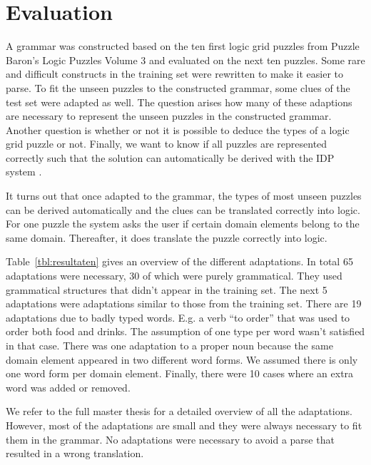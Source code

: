 \section{Evaluation}
A grammar was constructed based on the ten first logic grid puzzles from Puzzle Baron's Logic Puzzles Volume 3 \cite{logigrammen} and evaluated on the next ten puzzles. Some rare and difficult constructs in the training set were rewritten to make it easier to parse. To fit the unseen puzzles to the constructed grammar, some clues of the test set were adapted as well. The question arises how many of these adaptions are necessary to represent the unseen puzzles in the constructed grammar. Another question is whether or not it is possible to deduce the types of a logic grid puzzle or not. Finally, we want to know if all puzzles are represented correctly such that the solution can automatically be derived with the IDP system \cite{IDP}.

It turns out that once adapted to the grammar, the types of most unseen puzzles can be derived automatically and the clues can be translated correctly into logic. For one puzzle the system asks the user if certain domain elements belong to the same domain. Thereafter, it does translate the puzzle correctly into logic.

Table~\ref{tbl:resultaten} gives an overview of the different adaptations. In total 65 adaptations were necessary, 30 of which were purely grammatical. They used grammatical structures that didn't appear in the training set. The next 5 adaptations were adaptations similar to those from the training set. There are 19 adaptations due to badly typed words. E.g. a verb ``to order'' that was used to order both food and drinks. The assumption of one type per word wasn't satisfied in that case. There was one adaptation to a proper noun because the same domain element appeared in two different word forms. We assumed there is only one word form per domain element. Finally, there were 10 cases where an extra word was added or removed.

We refer to the full master thesis for a detailed overview of all the adaptations. However, most of the adaptations are small and they were always necessary to fit them in the grammar. No adaptations were necessary to avoid a parse that resulted in a wrong translation.

